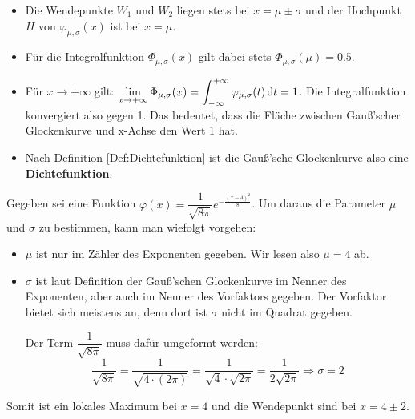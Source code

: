 \documentclass[ngerman, 12pt]{nssheetxea}
\begin{document}
\begin{definition}
\begin{center}
\end{center}

\begin{itemize}
\item Die Wendepunkte $W_1$ und $W_2$ liegen stets bei $x=\mu \pm \sigma$ und der Hochpunkt $H$ von $\varphi_{\mu, \sigma} (x)$ ist bei $x=\mu$.
\item Für die Integralfunktion $\Phi_{\mu, \sigma} (x)$ gilt dabei stets $\Phi_{\mu, \sigma} (\mu)=\num{0,5}$.
\item Für $x\to +\infty$ gilt: $\displaystyle \lim\limits_{x\to +\infty} \Phi_{\mu, \sigma} (x) = \int_{-\infty}^{+\infty} \varphi_{\mu, \sigma} (t) \mathop{}\!\mathrm{d} t = 1$. Die Integralfunktion konvergiert also gegen 1. Das bedeutet, dass die Fläche zwischen Gauß'scher Glockenkurve und x-Achse den Wert 1 hat.
\item Nach Definition \ref{Def:Dichtefunktion} ist die Gauß'sche Glockenkurve also eine \textbf{Dichtefunktion}.
\end{itemize}

\end{definition}

\begin{example}
Gegeben sei eine Funktion $\varphi(x)=\dfrac{1}{\sqrt{8\pi}}e^{-\frac{(x-4)^2}{8}}$. Um daraus die Parameter $\mu$ und $\sigma$ zu bestimmen, kann man wiefolgt vorgehen:
\begin{itemize}
\item $\mu$ ist nur im Zähler des Exponenten gegeben. Wir lesen also $\mu = 4$ ab.
\item $\sigma$ ist laut Definition der Gauß'schen Glockenkurve im Nenner des Exponenten, aber auch im Nenner des Vorfaktors gegeben. Der Vorfaktor bietet sich meistens an, denn dort ist $\sigma$ nicht im Quadrat gegeben. \par
Der Term $\dfrac{1}{\sqrt{8\pi}}$ muss dafür umgeformt werden:
\[ \dfrac{1}{\sqrt{8\pi}} = \dfrac{1}{\sqrt{4\cdot (2\pi)}} = \dfrac{1}{\sqrt{4} \cdot \sqrt{2\pi}} = \dfrac{1}{2\sqrt{2\pi}} \Rightarrow \sigma = 2  \]
\end{itemize}
Somit ist ein lokales Maximum bei $x=4$ und die Wendepunkt sind bei $x=4\pm 2$.
\end{example}
\end{document}
